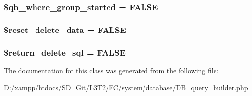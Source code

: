 \subsubsection[{\$qb\+\_\+where\+\_\+group\+\_\+started}]{\setlength{\rightskip}{0pt plus 5cm}\$qb\+\_\+where\+\_\+group\+\_\+started = F\+A\+L\+S\+E\hspace{0.3cm}{\ttfamily [protected]}}\label{class_c_i___d_b__query__builder_aaae9d24ab424373f1bdbc1b601074433}
\hypertarget{class_c_i___d_b__query__builder_aaeed877e8b1faeddaecaec6c890567ef}{}
\subsubsection[{\$reset\+\_\+delete\+\_\+data}]{\setlength{\rightskip}{0pt plus 5cm}\$reset\+\_\+delete\+\_\+data = F\+A\+L\+S\+E\hspace{0.3cm}{\ttfamily [protected]}}\label{class_c_i___d_b__query__builder_aaeed877e8b1faeddaecaec6c890567ef}
\hypertarget{class_c_i___d_b__query__builder_aee0c1cc88062e1b49fe9e057bfb288e6}{}
\subsubsection[{\$return\+\_\+delete\+\_\+sql}]{\setlength{\rightskip}{0pt plus 5cm}\$return\+\_\+delete\+\_\+sql = F\+A\+L\+S\+E\hspace{0.3cm}{\ttfamily [protected]}}\label{class_c_i___d_b__query__builder_aee0c1cc88062e1b49fe9e057bfb288e6}


The documentation for this class was generated from the following file\+:\begin{DoxyCompactItemize}
\item 
D\+:/xampp/htdocs/\+S\+D\+\_\+\+Git/\+L3\+T2/\+F\+C/system/database/\hyperlink{_d_b__query__builder_8php}{D\+B\+\_\+query\+\_\+builder.\+php}\end{DoxyCompactItemize}
